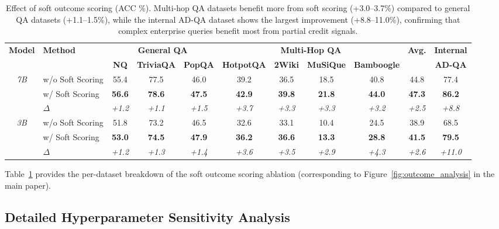 \documentclass[11pt]{article}
\begin{document}
\begin{table}[h]
\centering
\small
\begin{tabular}{cl|ccc|cccc|c|c}
\toprule
\multirow{2}{*}{\textbf{Model}} & \multirow{2}{*}{\textbf{Method}} & \multicolumn{3}{c|}{\textbf{General QA}} & \multicolumn{4}{c|}{\textbf{Multi-Hop QA}} & \multirow{2}{*}{\textbf{Avg.}} & \textbf{Internal} \\
& & \textbf{NQ} & \textbf{TriviaQA} & \textbf{PopQA} & \textbf{HotpotQA} & \textbf{2Wiki} & \textbf{MuSiQue} & \textbf{Bamboogle} & & \textbf{AD-QA} \\
\midrule
\multirow{3}{*}{\textit{7B}} 
& w/o Soft Scoring & 55.4 & 77.5 & 46.0 & 39.2 & 36.5 & 18.5 & 40.8 & 44.8 & 77.4 \\
& w/ Soft Scoring & \textbf{56.6} & \textbf{78.6} & \textbf{47.5} & \textbf{42.9} & \textbf{39.8} & \textbf{21.8} & \textbf{44.0} & \textbf{47.3} & \textbf{86.2} \\
& \quad \textit{$\Delta$} & \textit{+1.2} & \textit{+1.1} & \textit{+1.5} & \textit{+3.7} & \textit{+3.3} & \textit{+3.3} & \textit{+3.2} & \textit{+2.5} & \textit{+8.8} \\
\midrule
\multirow{3}{*}{\textit{3B}} 
& w/o Soft Scoring & 51.8 & 73.2 & 46.5 & 32.6 & 33.1 & 10.4 & 24.5 & 38.9 & 68.5 \\
& w/ Soft Scoring & \textbf{53.0} & \textbf{74.5} & \textbf{47.9} & \textbf{36.2} & \textbf{36.6} & \textbf{13.3} & \textbf{28.8} & \textbf{41.5} & \textbf{79.5} \\
& \quad \textit{$\Delta$} & \textit{+1.2} & \textit{+1.3} & \textit{+1.4} & \textit{+3.6} & \textit{+3.5} & \textit{+2.9} & \textit{+4.3} & \textit{+2.6} & \textit{+11.0} \\
\bottomrule
\end{tabular}
\caption{Effect of soft outcome scoring (ACC \%). Multi-hop QA datasets benefit more from soft scoring (+3.0--3.7\%) compared to general QA datasets (+1.1--1.5\%), while the internal AD-QA dataset shows the largest improvement (+8.8--11.0\%), confirming that complex enterprise queries benefit most from partial credit signals.}
\label{tab:soft_outcome_detailed}
\end{table}

Table~\ref{tab:soft_outcome_detailed} provides the per-dataset breakdown of the soft outcome scoring ablation (corresponding to Figure~\ref{fig:outcome_analysis} in the main paper).

\subsection{Detailed Hyperparameter Sensitivity Analysis}
\label{sec:appendix_hyperparameter}
\end{document}
